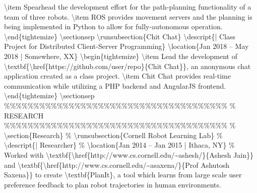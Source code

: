 \documentclass{article}%
\begin{document}
\textbackslash{}item Spearhead the development effort for the path{-}planning functionality of a team of three robots.\newline%
\textbackslash{}item ROS provides movement servers and the planning is being implemented in Python to allow for fully{-}autonomous operation.\newline%
\textbackslash{}end\{tightemize\}\newline%
\textbackslash{}sectionsep\newline%
\newline%
\textbackslash{}runsubsection\{Chit Chat\}\newline%
\textbackslash{}descript\{| Class Project for Distributed Client{-}Server Programming\}\newline%
\textbackslash{}location\{Jan 2018 – May 2018 | Somewhere, XX\}\newline%
\textbackslash{}begin\{tightemize\}\newline%
\textbackslash{}item Lead the development of \textbackslash{}textbf\{\textbackslash{}href\{https://github.com/user/repo\}\{Chit Chat\}\}, an anonymous chat application created as a class project.\newline%
\textbackslash{}item Chit Chat provides real{-}time communication while utilizing a PHP backend and AngularJS frontend.\newline%
\textbackslash{}end\{tightemize\}\newline%
\textbackslash{}sectionsep\newline%
\newline%
\%\%\%\%\%\%\%\%\%\%\%\%\%\%\%\%\%\%\%\%\%\%\%\%\%\%\%\%\%\%\%\%\%\%\%\%\%\%\newline%
\%     RESEARCH\newline%
\%\%\%\%\%\%\%\%\%\%\%\%\%\%\%\%\%\%\%\%\%\%\%\%\%\%\%\%\%\%\%\%\%\%\%\%\%\%\newline%
\newline%
\% \textbackslash{}section\{Research\}\newline%
\% \textbackslash{}runsubsection\{Cornell Robot Learning Lab\}\newline%
\% \textbackslash{}descript\{| Researcher\}\newline%
\% \textbackslash{}location\{Jan 2014 – Jan 2015 | Ithaca, NY\}\newline%
\% Worked with \textbackslash{}textbf\{\textbackslash{}href\{http://www.cs.cornell.edu/\textasciitilde{}ashesh/\}\{Ashesh Jain\}\} and \textbackslash{}textbf\{\textbackslash{}href\{http://www.cs.cornell.edu/\textasciitilde{}asaxena/\}\{Prof Ashutosh Saxena\}\} to create \textbackslash{}textbf\{PlanIt\}, a tool which  learns from large scale user preference feedback to plan robot trajectories in human environments.\newline%
\end{document}
